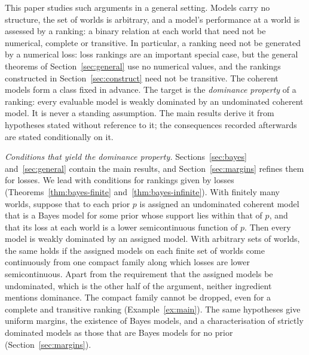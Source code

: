 \documentclass[11pt]{article}
\theoremstyle{definition}
\theoremstyle{remark}
\begin{document}
This paper studies such arguments in a general setting. Models carry no structure, the set of worlds is arbitrary, and a model's performance at a world is assessed by a ranking: a binary relation at each world that need not be numerical, complete or transitive. In particular, a ranking need not be generated by a numerical loss: loss rankings are an important special case, but the general theorems of Section~\ref{sec:general} use no numerical values, and the rankings constructed in Section~\ref{sec:construct} need not be transitive. The coherent models form a class fixed in advance. The target is the \emph{dominance property} of a ranking: every evaluable model is weakly dominated by an undominated coherent model. It is never a standing assumption. The main results derive it from hypotheses stated without reference to it; the consequences recorded afterwards are stated conditionally on it.

\emph{Conditions that yield the dominance property.} Sections~\ref{sec:bayes} and~\ref{sec:general} contain the main results, and Section~\ref{sec:margins} refines them for losses. We lead with conditions for rankings given by losses (Theorems~\ref{thm:bayes-finite} and~\ref{thm:bayes-infinite}). With finitely many worlds, suppose that to each prior $p$ is assigned an undominated coherent model that is a Bayes model for some prior whose support lies within that of $p$, and that its loss at each world is a lower semicontinuous function of $p$. Then every model is weakly dominated by an assigned model. With arbitrary sets of worlds, the same holds if the assigned models on each finite set of worlds come continuously from one compact family along which losses are lower semicontinuous. Apart from the requirement that the assigned models be undominated, which is the other half of the argument, neither ingredient mentions dominance. The compact family cannot be dropped, even for a complete and transitive ranking (Example~\ref{ex:main}). The same hypotheses give uniform margins, the existence of Bayes models, and a characterisation of strictly dominated models as those that are Bayes models for no prior (Section~\ref{sec:margins}).
\end{document}
